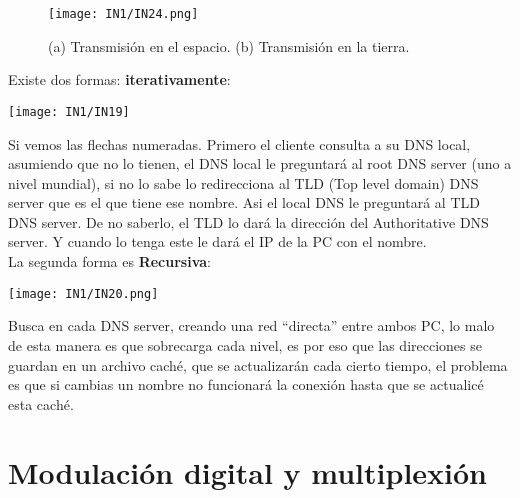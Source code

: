 \documentclass[
	12pt, %
	fleqn, %
	a4paper, %
	oneside, %
]{LegrandOrangeBook}
\begin{document}
\begin{figure}[]
\centering
\texttt{[image: IN1/IN24.png]}
\caption{(a) Transmisión en el espacio. (b) Transmisión en la tierra.}
\label{fig: iridium-global}
\end{figure}
\begin{proposition}
Existe dos formas: \textbf{iterativamente}:
\begin{center}
\texttt{[image: IN1/IN19]}
\end{center}
Si vemos las flechas numeradas. Primero el cliente consulta a su DNS local, asumiendo que no lo tienen, el DNS local  le preguntará al root DNS server (uno a nivel mundial), si no lo sabe lo redirecciona al TLD (Top level domain) DNS server que es el que tiene ese nombre. Asi el local DNS le preguntará al TLD DNS server. De no saberlo, el TLD lo dará la dirección del Authoritative DNS server. Y cuando lo tenga este le dará el IP de la PC con el nombre.\\
La segunda forma es \textbf{Recursiva}:
\begin{center}
\texttt{[image: IN1/IN20.png]}
\end{center}
Busca en cada DNS server, creando una red ``directa'' entre ambos PC, lo malo de esta manera es que sobrecarga cada nivel, es por eso que las direcciones se guardan en un archivo caché, que se actualizarán cada cierto tiempo, el problema es que si cambias un nombre no funcionará la conexión hasta que se actualicé esta caché.
\end{proposition}
\section{Modulación digital y multiplexión}
\end{document}
